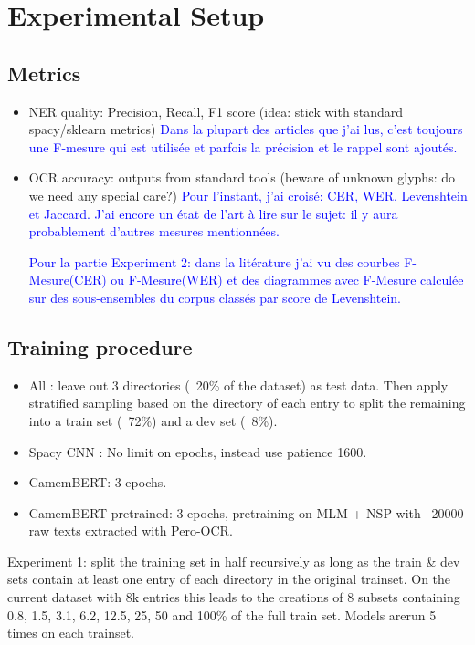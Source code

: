 \section{Experimental Setup}

\subsection{Metrics}
\begin{itemize}
    \item NER quality: Precision, Recall, F1 score (idea: stick with standard spacy/sklearn metrics) \textcolor{blue}{Dans la plupart des articles que j'ai lus, c'est toujours une F-mesure qui est utilisée et parfois la précision et le rappel sont ajoutés.}
    \item OCR accuracy: outputs from standard tools (beware of unknown glyphs: do we need any special care?) \textcolor{blue}{Pour l'instant, j'ai croisé: CER, WER, Levenshtein et Jaccard. J'ai encore un état de l'art à lire sur le sujet: il y aura probablement d'autres mesures mentionnées.}
    
    \textcolor{blue}{Pour la partie Experiment 2: dans la litérature j'ai vu des courbes F-Mesure(CER) ou F-Mesure(WER) et des diagrammes avec F-Mesure calculée sur des sous-ensembles du corpus classés par score de Levenshtein.}
\end{itemize}

\subsection{Training procedure}

\begin{itemize}
\item All : leave out 3 directories (~20\% of the dataset) as test data. Then apply stratified sampling based on the directory of each entry to split the remaining into a train set (~72\%) and a dev set (~8\%).
\item Spacy CNN : No limit on epochs, instead use patience 1600.
\item CamemBERT: 3 epochs.
\item CamemBERT pretrained: 3 epochs, pretraining on MLM + NSP with ~20000 raw texts extracted with Pero-OCR.
\end{itemize}

Experiment 1: split the training set in half recursively as long as the train \& dev sets contain at least one entry of each directory in the original trainset. On the current dataset with 8k entries this leads to the creations of 8 subsets containing 0.8, 1.5, 3.1, 6.2, 12.5, 25, 50 and 100\% of the full train set. Models arerun 5 times on each trainset. 


